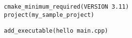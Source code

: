 \begin{lstlisting}
cmake_minimum_required(VERSION 3.11)
project(my_sample_project)

add_executable(hello main.cpp)\end{lstlisting}
